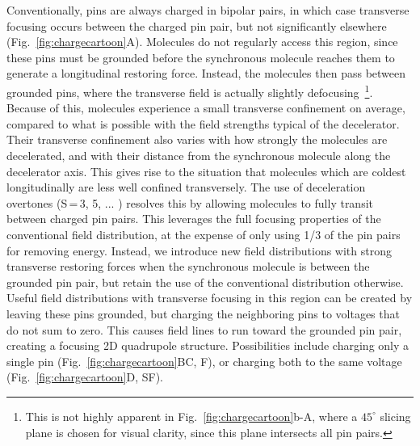 \documentclass[%
 reprint,
 amsmath,amssymb,
 aps,
prl,
]{revtex4-1}
\begin{document}
Conventionally, pins are always charged in bipolar pairs, in which case transverse focusing occurs between the charged pin pair, but not significantly elsewhere (Fig.~\ref{fig:chargecartoon}A).
Molecules do not regularly access this region, since these pins must be grounded before the synchronous molecule reaches them to generate a longitudinal restoring force.
Instead, the molecules then pass between grounded pins, where the transverse field is actually slightly defocusing~\footnote{This is not highly apparent in Fig.~\ref{fig:chargecartoon}b-A, where a $45^\circ$ slicing plane is chosen for visual clarity, since this plane intersects all pin pairs.}.
Because of this, molecules experience a small transverse confinement on average, compared to what is possible with the field strengths typical of the decelerator. 
Their transverse confinement also varies with how strongly the molecules are decelerated, and with their distance from the synchronous molecule along the decelerator axis. 
This gives rise to the situation that molecules which are coldest longitudinally are less well confined transversely.
The use of deceleration overtones (S\,=\,3, 5, ... ) \cite{VanDeMeerakker2005a} resolves this by allowing molecules to fully transit between charged pin pairs. 
This leverages the full focusing properties of the conventional field distribution, at the expense of only using 1/3 of the pin pairs for removing energy. 
Instead, we introduce new field distributions with strong transverse restoring forces when the synchronous molecule is between the grounded pin pair, but retain the use of the conventional distribution otherwise.
Useful field distributions with transverse focusing in this region can be created by leaving these pins grounded, but charging the neighboring pins to voltages that do not sum to zero.
This causes field lines to run toward the grounded pin pair, creating a focusing 2D quadrupole structure.
Possibilities include charging only a single pin (Fig.~\ref{fig:chargecartoon}BC, F), or charging both to the same voltage (Fig.~\ref{fig:chargecartoon}D, SF).
\end{document}
